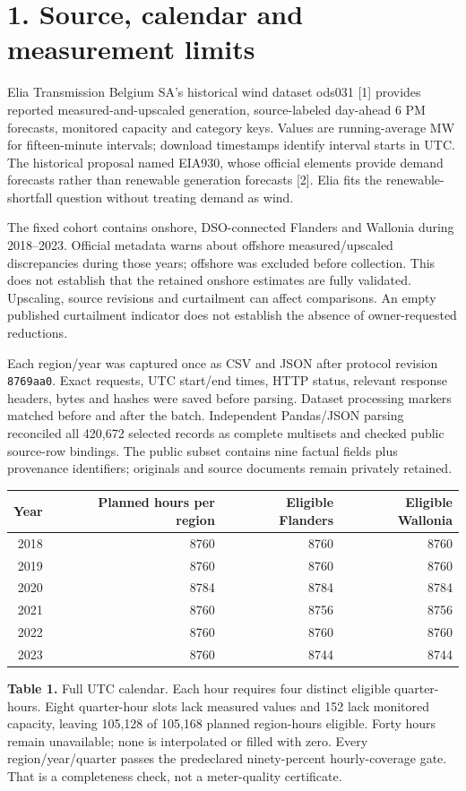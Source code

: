\documentclass[10pt,letterpaper]{article}
\begin{document}
\section*{1. Source, calendar and measurement limits}
Elia Transmission Belgium SA's historical wind dataset ods031 [1] provides reported measured-and-upscaled generation, source-labeled day-ahead 6 PM forecasts, monitored capacity and category keys. Values are running-average MW for fifteen-minute intervals; download timestamps identify interval starts in UTC. The historical proposal named EIA930, whose official elements provide demand forecasts rather than renewable generation forecasts [2]. Elia fits the renewable-shortfall question without treating demand as wind.

The fixed cohort contains onshore, DSO-connected Flanders and Wallonia during 2018--2023. Official metadata warns about offshore measured/upscaled discrepancies during those years; offshore was excluded before collection. This does not establish that the retained onshore estimates are fully validated. Upscaling, source revisions and curtailment can affect comparisons. An empty published curtailment indicator does not establish the absence of owner-requested reductions.

Each region/year was captured once as CSV and JSON after protocol revision \texttt{8769aa0}. Exact requests, UTC start/end times, HTTP status, relevant response headers, bytes and hashes were saved before parsing. Dataset processing markers matched before and after the batch. Independent Pandas/JSON parsing reconciled all 420,672 selected records as complete multisets and checked public source-row bindings. The public subset contains nine factual fields plus provenance identifiers; originals and source documents remain privately retained.

\begin{center}\begin{tabular}{rrrr}\toprule
Year & Planned hours per region & Eligible Flanders & Eligible Wallonia\\\midrule
2018 & 8760 & 8760 & 8760 \\
2019 & 8760 & 8760 & 8760 \\
2020 & 8784 & 8784 & 8784 \\
2021 & 8760 & 8756 & 8756 \\
2022 & 8760 & 8760 & 8760 \\
2023 & 8760 & 8744 & 8744 \\
\bottomrule\end{tabular}\end{center}
\textbf{Table 1.} Full UTC calendar. Each hour requires four distinct eligible quarter-hours. Eight quarter-hour slots lack measured values and 152 lack monitored capacity, leaving 105,128 of 105,168 planned region-hours eligible. Forty hours remain unavailable; none is interpolated or filled with zero. Every region/year/quarter passes the predeclared ninety-percent hourly-coverage gate. That is a completeness check, not a meter-quality certificate.
\end{document}
